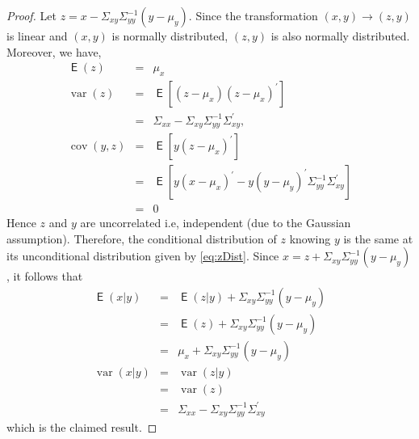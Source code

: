 \documentclass{article}
\DeclareMathOperator{\var}{var}
\DeclareMathOperator{\cov}{cov}
\DeclareMathOperator{\E}{\mathsf{E}}
\begin{document}
\begin{proof}
  Let $z= x - \Sigma_{xy} \Sigma_{yy}^{-1} (y-\mu_y)$. Since the transformation
  $(x,y) \rightarrow (z,y)$ is linear and $(x,y)$ is normally distributed, $(z,y)$ is also
  normally distributed. Moreover, we have,
  \begin{equation}
  \begin{array}{rcl}
    \E (z)  & = & \mu_x \\
    \var(z) & = & \E [(z -\mu_x)(z -\mu_x)^\prime] \\
            & = & \Sigma_{xx} - \Sigma_{xy}\Sigma_{yy}^{-1}\Sigma_{xy}^\prime, \\
    \cov(y,z) & = & \E [y(z -\mu_x)^\prime] \\
              & = & \E [y(x -\mu_x)^\prime -y(y-\mu_y)^\prime \Sigma_{yy}^{-1}\Sigma_{xy}^\prime ] \\
              & = & 0
  \end{array}
  \label{eq:zDist}
\end{equation}
Hence $z$ and $y$ are uncorrelated i.e, independent (due to the Gaussian
assumption). Therefore, the conditional distribution of $z$ knowing $y$ is the same at its
unconditional distribution given by \eqref{eq:zDist}. Since
$x = z + \Sigma_{xy} \Sigma_{yy}^{-1} (y-\mu_y)$, it follows that
\begin{equation}
\begin{array}{rcl}
    \E (x|y)  & = & \E (z |y) + \Sigma_{xy} \Sigma_{yy}^{-1} (y-\mu_y) \\
              & = & \E (z) + \Sigma_{xy} \Sigma_{yy}^{-1} (y-\mu_y) \\
              & = &  \mu_x + \Sigma_{xy} \Sigma_{yy}^{-1} (y-\mu_y) \\
    \var(x|y) & = & \var (z|y) \\
              & = & \var (z) \\
              & = & \Sigma_{xx} - \Sigma_{xy}\Sigma_{yy}^{-1}\Sigma_{xy}^\prime
  \end{array}
\end{equation}
which is the claimed result.
\end{proof}
\end{document}
